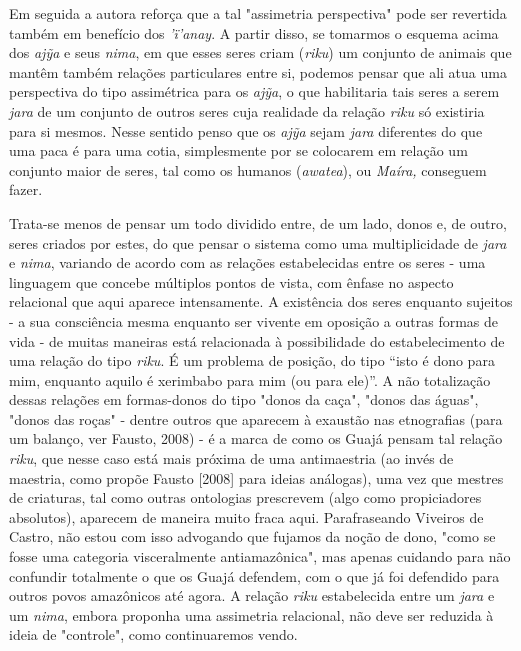 Em seguida a autora reforça que a tal "assimetria perspectiva" pode ser
revertida também em benefício dos \emph{'ï'anay}. A partir disso, se
tomarmos o esquema acima dos \emph{ajỹa} e seus \emph{nima}, em que
esses seres criam (\emph{riku}) um conjunto de animais que mantêm também
relações particulares entre si, podemos pensar que ali atua uma
perspectiva do tipo assimétrica para os \emph{ajỹa}, o que habilitaria
tais seres a serem \emph{jara} de um conjunto de outros seres cuja
realidade da relação \emph{riku} só existiria para si mesmos. Nesse
sentido penso que os \emph{ajỹa} sejam \emph{jara} diferentes do que uma
paca é para uma cotia, simplesmente por se colocarem em relação um
conjunto maior de seres, tal como os humanos (\emph{awatea}), ou
\emph{Maíra,} conseguem fazer.

Trata-se menos de pensar um todo dividido entre, de um lado, donos e, de
outro, seres criados por estes, do que pensar o sistema como uma
multiplicidade de \emph{jara} e \emph{nima}, variando de acordo com as
relações estabelecidas entre os seres - uma linguagem que concebe
múltiplos pontos de vista, com ênfase no aspecto relacional que aqui
aparece intensamente. A existência dos seres enquanto sujeitos - a sua
consciência mesma enquanto ser vivente em oposição a outras formas de
vida - de muitas maneiras está relacionada à possibilidade do
estabelecimento de uma relação do tipo \emph{riku}. É um problema de
posição, do tipo ``isto é dono para mim, enquanto aquilo é xerimbabo
para mim (ou para ele)''. A não totalização dessas relações em
formas-donos do tipo "donos da caça", "donos das águas", "donos das
roças" - dentre outros que aparecem à exaustão nas etnografias (para um
balanço, ver Fausto, 2008) - é a marca de como os Guajá pensam tal
relação \emph{riku}, que nesse caso está mais próxima de uma
antimaestria (ao invés de maestria, como propõe Fausto {[}2008{]} para
ideias análogas), uma vez que mestres de criaturas, tal como outras
ontologias prescrevem (algo como propiciadores absolutos), aparecem de
maneira muito fraca aqui. Parafraseando Viveiros de Castro, não estou
com isso advogando que fujamos da noção de dono, "como se fosse uma
categoria visceralmente antiamazônica", mas apenas cuidando para não
confundir totalmente o que os Guajá defendem, com o que já foi defendido
para outros povos amazônicos até agora. A relação \emph{riku}
estabelecida entre um \emph{jara} e um \emph{nima}, embora proponha uma
assimetria relacional, não deve ser reduzida à ideia de "controle", como
continuaremos vendo.

